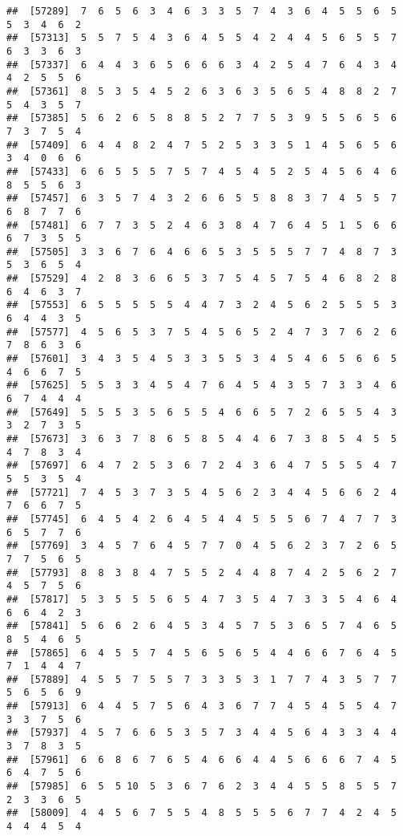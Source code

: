 \documentclass[
]{book}
\begin{document}
\begin{verbatim}
##  [57289]  7  6  5  6  3  4  6  3  3  5  7  4  3  6  4  5  5  6  5  5  3  4  6  2
##  [57313]  5  5  7  5  4  3  6  4  5  5  4  2  4  4  5  6  5  5  7  6  3  3  6  3
##  [57337]  6  4  4  3  6  5  6  6  6  3  4  2  5  4  7  6  4  3  4  4  2  5  5  6
##  [57361]  8  5  3  5  4  5  2  6  3  6  3  5  6  5  4  8  8  2  7  5  4  3  5  7
##  [57385]  5  6  2  6  5  8  8  5  2  7  7  5  3  9  5  5  6  5  6  7  3  7  5  4
##  [57409]  6  4  4  8  2  4  7  5  2  5  3  3  5  1  4  5  6  5  6  3  4  0  6  6
##  [57433]  6  6  5  5  5  7  5  7  4  5  4  5  2  5  4  5  6  4  6  8  5  5  6  3
##  [57457]  6  3  5  7  4  3  2  6  6  5  5  8  8  3  7  4  5  5  7  6  8  7  7  6
##  [57481]  6  7  7  3  5  2  4  6  3  8  4  7  6  4  5  1  5  6  6  6  7  3  5  5
##  [57505]  3  3  6  7  6  4  6  6  5  3  5  5  5  7  7  4  8  7  3  5  3  6  5  4
##  [57529]  4  2  8  3  6  6  5  3  7  5  4  5  7  5  4  6  8  2  8  6  4  6  3  7
##  [57553]  6  5  5  5  5  5  4  4  7  3  2  4  5  6  2  5  5  5  3  6  4  4  3  5
##  [57577]  4  5  6  5  3  7  5  4  5  6  5  2  4  7  3  7  6  2  6  7  8  6  3  6
##  [57601]  3  4  3  5  4  5  3  3  5  5  3  4  5  4  6  5  6  6  5  4  6  6  7  5
##  [57625]  5  5  3  3  4  5  4  7  6  4  5  4  3  5  7  3  3  4  6  6  7  4  4  4
##  [57649]  5  5  5  3  5  6  5  5  4  6  6  5  7  2  6  5  5  4  3  3  2  7  3  5
##  [57673]  3  6  3  7  8  6  5  8  5  4  4  6  7  3  8  5  4  5  5  4  7  8  3  4
##  [57697]  6  4  7  2  5  3  6  7  2  4  3  6  4  7  5  5  5  4  7  5  5  3  5  4
##  [57721]  7  4  5  3  7  3  5  4  5  6  2  3  4  4  5  6  6  2  4  7  6  6  7  5
##  [57745]  6  4  5  4  2  6  4  5  4  4  5  5  5  6  7  4  7  7  3  6  5  7  7  6
##  [57769]  3  4  5  7  6  4  5  7  7  0  4  5  6  2  3  7  2  6  5  7  7  5  6  5
##  [57793]  8  8  3  8  4  7  5  5  2  4  4  8  7  4  2  5  6  2  7  4  5  7  5  6
##  [57817]  5  3  5  5  5  6  5  4  7  3  5  4  7  3  3  5  4  6  4  6  6  4  2  3
##  [57841]  5  6  6  2  6  4  5  3  4  5  7  5  3  6  5  7  4  6  5  8  5  4  6  5
##  [57865]  6  4  5  5  7  4  5  6  5  6  5  4  4  6  6  7  6  4  5  7  1  4  4  7
##  [57889]  4  5  5  7  5  5  7  3  3  5  3  1  7  7  4  3  5  7  7  5  6  5  6  9
##  [57913]  6  4  4  5  7  5  6  4  3  6  7  7  4  5  4  5  5  4  7  3  3  7  5  6
##  [57937]  4  5  7  6  6  5  3  5  7  3  4  4  5  6  4  3  3  4  4  3  7  8  3  5
##  [57961]  6  6  8  6  7  6  5  4  6  6  4  4  5  6  6  6  7  4  5  6  4  7  5  6
##  [57985]  6  5  5 10  5  3  6  7  6  2  3  4  4  5  5  8  5  5  7  2  3  3  6  5
##  [58009]  4  4  5  6  7  5  5  4  8  5  5  5  6  7  7  4  2  4  5  4  4  4  5  4

\end{verbatim}
\end{document}
